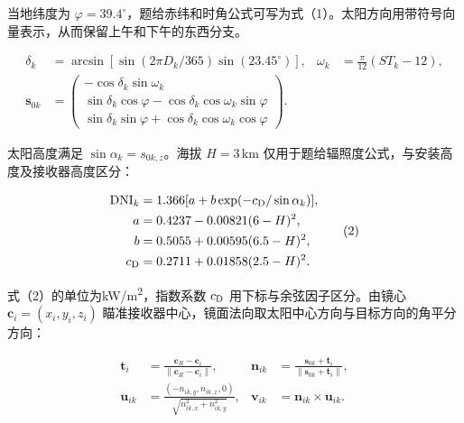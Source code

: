 \documentclass[UTF8,fontset=windows,zihao=-4]{ctexart}
\begin{document}
\par\noindent\begin{minipage}{\linewidth}
当地纬度为 \(\varphi=39.4^\circ\)，题给赤纬和时角公式可写为式（1）。太阳方向用带符号向量表示，从而保留上午和下午的东西分支。

\[
\begin{aligned}
\delta_k&=\arcsin[\sin(2\pi D_k/365)\sin(23.45^\circ)],
&\omega_k&=\frac{\pi}{12}(ST_k-12),\\
\boldsymbol s_{0k}&=\begin{pmatrix}
-\cos\delta_k\sin\omega_k\\
\sin\delta_k\cos\varphi-\cos\delta_k\cos\omega_k\sin\varphi\\
\sin\delta_k\sin\varphi+\cos\delta_k\cos\omega_k\cos\varphi
\end{pmatrix}.
\end{aligned}\tag{1}
\]
\end{minipage}\par

\par\noindent\begin{minipage}{\linewidth}
太阳高度满足 \(\sin\alpha_k=s_{0k,z}\)。海拔 \(H=3\,\mathrm{km}\) 仅用于题给辐照度公式，与安装高度及接收器高度区分：

\[
\begin{aligned}
\mathrm{DNI}_k&=1.366[a+b\exp(-c_{\rm D}/\sin\alpha_k)],\\
a&=0.4237-0.00821(6-H)^2,\\
b&=0.5055+0.00595(6.5-H)^2,\\
c_{\rm D}&=0.2711+0.01858(2.5-H)^2.
\end{aligned}\tag{2}
\]
\end{minipage}\par

\par\noindent\begin{minipage}{\linewidth}
式（2）的单位为kW/m\textsuperscript{2}，指数系数 \(c_{\rm D}\) 用下标与余弦因子区分。由镜心 \(\boldsymbol c_i=(x_i,y_i,z_i)\) 瞄准接收器中心，镜面法向取太阳中心方向与目标方向的角平分方向：

\[
\begin{aligned}
\boldsymbol t_i&=\frac{\boldsymbol c_R-\boldsymbol c_i}{\|\boldsymbol c_R-\boldsymbol c_i\|},
&\boldsymbol n_{ik}&=\frac{\boldsymbol s_{0k}+\boldsymbol t_i}{\|\boldsymbol s_{0k}+\boldsymbol t_i\|},\\
\boldsymbol u_{ik}&=\frac{(-n_{ik,y},n_{ik,x},0)}{\sqrt{n_{ik,x}^2+n_{ik,y}^2}},
&\boldsymbol v_{ik}&=\boldsymbol n_{ik}\times\boldsymbol u_{ik}.
\end{aligned}\tag{3}
\]
\end{minipage}\par
\end{document}
